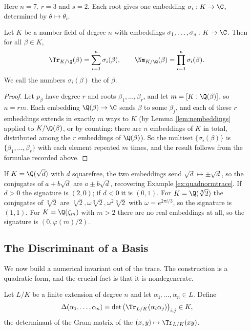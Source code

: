 Here $n = 7$, $r = 3$ and $s = 2$. Each root gives one embedding $\sigma_i : K \to \C$, determined by $\theta \mapsto \theta_i$.

\begin{lemma}\label{lem:normtraceembed}
	Let $K$ be a number field of degree $n$ with embeddings $\sigma_1, \dots, \sigma_n : K \to \C$. Then for all $\beta \in K$,
	$$\Tr_{K/\Q}(\beta) = \sum_{i=1}^n \sigma_i(\beta), \qquad \Nm_{K/\Q}(\beta) = \prod_{i=1}^n \sigma_i(\beta).$$
	We call the numbers $\sigma_i(\beta)$ the  of $\beta$.
\end{lemma}

\begin{proof}
	Let $p_\beta$ have degree $r$ and roots $\beta_1, \dots, \beta_r$, and let $m = [K : \Q(\beta)]$, so $n = rm$. Each embedding $\Q(\beta) \to \C$ sends $\beta$ to some $\beta_j$, and each of these $r$ embeddings extends in exactly $m$ ways to $K$ (by Lemma \ref{lem:nembeddings} applied to $K/\Q(\beta)$, or by counting: there are $n$ embeddings of $K$ in total, distributed among the $r$ embeddings of $\Q(\beta)$). So the multiset $\{\sigma_i(\beta)\}$ is $\{\beta_1, \dots, \beta_r\}$ with each element repeated $m$ times, and the result follows from the formulae recorded above.
\end{proof}

\begin{example}
	If $K = \Q(\sqrt d)$ with $d$ squarefree, the two embeddings send $\sqrt d \mapsto \pm\sqrt d$, so the conjugates of $a + b\sqrt d$ are $a \pm b\sqrt d$, recovering Example \ref{ex:quadnormtrace}. If $d > 0$ the signature is $(2, 0)$; if $d < 0$ it is $(0,1)$. For $K = \Q(\sqrt[3]{2})$ the conjugates of $\sqrt[3]2$ are $\sqrt[3]2, \omega\sqrt[3]2, \omega^2\sqrt[3]2$ with $\omega = e^{2\pi i/3}$, so the signature is $(1,1)$. For $K = \Q(\zeta_m)$ with $m > 2$ there are no real embeddings at all, so the signature is $(0, \varphi(m)/2)$.
\end{example}

\subsection{The Discriminant of a Basis}

We now build a numerical invariant out of the trace. The construction is a quadratic form, and the crucial fact is that it is nondegenerate.

\begin{definition}
	Let $L/K$ be a finite extension of degree $n$ and let $\alpha_1, \dots, \alpha_n \in L$. Define
	$$\Delta(\alpha_1, \dots, \alpha_n) = \det\left( \Tr_{L/K}(\alpha_i\alpha_j) \right)_{i,j} \in K,$$
	the determinant of the Gram matrix of the  $(x,y) \mapsto \Tr_{L/K}(xy)$.
\end{definition}

